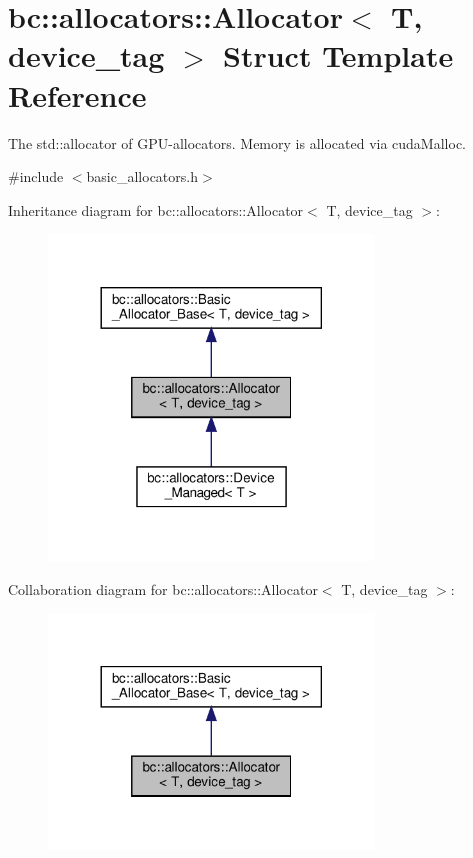 \hypertarget{structbc_1_1allocators_1_1Allocator_3_01T_00_01device__tag_01_4}{}\section{bc\+:\+:allocators\+:\+:Allocator$<$ T, device\+\_\+tag $>$ Struct Template Reference}
\label{structbc_1_1allocators_1_1Allocator_3_01T_00_01device__tag_01_4}


The \textquotesingle{}std\+::allocator\textquotesingle{} of G\+P\+U-\/allocators. Memory is allocated via \textquotesingle{}cuda\+Malloc\textquotesingle{}.  




{\ttfamily \#include $<$basic\+\_\+allocators.\+h$>$}



Inheritance diagram for bc\+:\+:allocators\+:\+:Allocator$<$ T, device\+\_\+tag $>$\+:\nopagebreak
\begin{figure}[H]
\begin{center}
\leavevmode
\includegraphics[width=245pt]{structbc_1_1allocators_1_1Allocator_3_01T_00_01device__tag_01_4__inherit__graph}
\end{center}
\end{figure}


Collaboration diagram for bc\+:\+:allocators\+:\+:Allocator$<$ T, device\+\_\+tag $>$\+:\nopagebreak
\begin{figure}[H]
\begin{center}
\leavevmode
\includegraphics[width=245pt]{structbc_1_1allocators_1_1Allocator_3_01T_00_01device__tag_01_4__coll__graph}
\end{center}
\end{figure}
